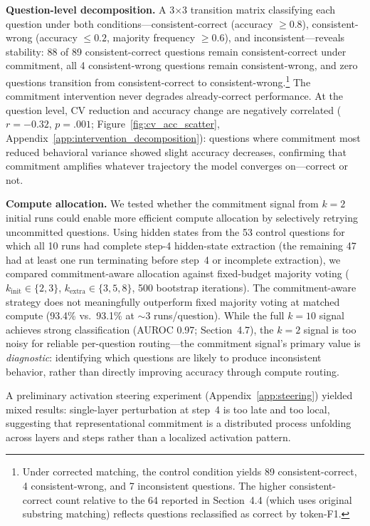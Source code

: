 \documentclass{article}
\begin{document}
\textbf{Question-level decomposition.} A 3$\times$3 transition matrix classifying each question under both conditions---consistent-correct (accuracy $\geq 0.8$), consistent-wrong (accuracy $\leq 0.2$, majority frequency $\geq 0.6$), and inconsistent---reveals stability: 88 of 89 consistent-correct questions remain consistent-correct under commitment, all 4 consistent-wrong questions remain consistent-wrong, and zero questions transition from consistent-correct to consistent-wrong.\footnote{Under corrected matching, the control condition yields 89 consistent-correct, 4 consistent-wrong, and 7 inconsistent questions. The higher consistent-correct count relative to the 64 reported in Section~4.4 (which uses original substring matching) reflects questions reclassified as correct by token-F1.} The commitment intervention never degrades already-correct performance. At the question level, CV reduction and accuracy change are negatively correlated ($r = -0.32$, $p = .001$; Figure~\ref{fig:cv_acc_scatter}, Appendix~\ref{app:intervention_decomposition}): questions where commitment most reduced behavioral variance showed slight accuracy decreases, confirming that commitment amplifies whatever trajectory the model converges on---correct or not.

\textbf{Compute allocation.} We tested whether the commitment signal from $k{=}2$ initial runs could enable more efficient compute allocation by selectively retrying uncommitted questions. Using hidden states from the 53 control questions for which all 10 runs had complete step-4 hidden-state extraction (the remaining 47 had at least one run terminating before step~4 or incomplete extraction), we compared commitment-aware allocation against fixed-budget majority voting ($k_\text{init} \in \{2, 3\}$, $k_\text{extra} \in \{3, 5, 8\}$, 500 bootstrap iterations). The commitment-aware strategy does not meaningfully outperform fixed majority voting at matched compute (93.4\% vs.\ 93.1\% at ${\sim}$3 runs/question). While the full $k{=}10$ signal achieves strong classification (AUROC 0.97; Section~4.7), the $k{=}2$ signal is too noisy for reliable per-question routing---the commitment signal's primary value is \emph{diagnostic}: identifying which questions are likely to produce inconsistent behavior, rather than directly improving accuracy through compute routing.

A preliminary activation steering experiment (Appendix~\ref{app:steering}) yielded mixed results: single-layer perturbation at step~4 is too late and too local, suggesting that representational commitment is a distributed process unfolding across layers and steps rather than a localized activation pattern.
\end{document}

